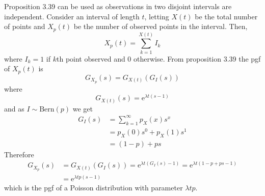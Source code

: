 \documentclass[12pt,a4paper,draft]{report}
\begin{document}
Proposition 3.39 can be used as observations in two disjoint intervals are independent. Consider an interval of length $t$, letting $X(t)$ be the total number of points and $X_p(t)$ be the number of observed points in the interval. Then,
\begin{equation}
X_p(t)=\sum_{k=1}^{X(t)}I_k
\end{equation}
where $I_k=1$ if $k$th point observed and 0 otherwise. From proposition 3.39 the pgf of  $X_p(t)$ is
\begin{equation}
G_{X_p}(s)=G_{X(t)}(G_{I}(s))
\end{equation}
where
\begin{equation}
G_{X(t)}(s)=\mathrm{e}^{\lambda t(s-1)}
\end{equation}
and as $I\sim\text{Bern}(p)$ we get
\begin{align*}
G_I(s)&=\sum_{k=1}^{\infty}p_X(x)s^x\\
&=p_X(0)s^0+p_X(1)s^1\\
&=(1-p)+ps
\end{align*}
Therefore
\begin{align*}
G_{X_p}(s)&=G_{X(t)}(G_I(s))=\mathrm{e}^{\lambda t(G_I(s)-1)}=\mathrm{e}^{\lambda t(1-p+ps-1)}\\
&=\mathrm{e}^{\lambda tp(s-1)}
\end{align*}
which is the pgf of a Poisson distribution with parameter $\lambda tp$.
\end{document}

